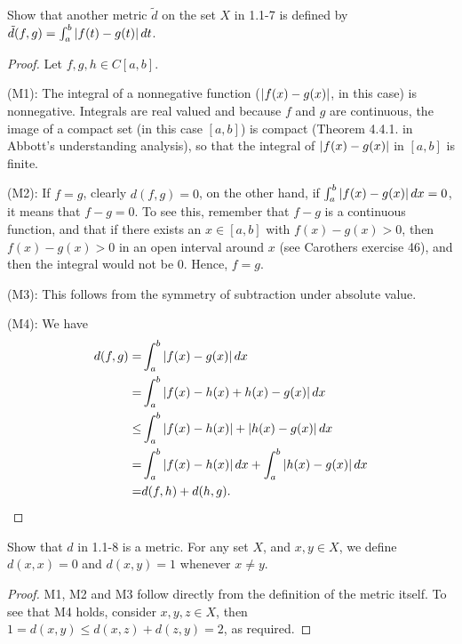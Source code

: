 \begin{exercise}{8}
Show that another metric $\tilde{d}$ on the set $X$ in 1.1-7 is defined by $\tilde{d}(f,g)=\int_a^b\left\lvert f(t)-g(t)\right\rvert dt$.
\end{exercise}
\begin{proof}
Let $f,g,h\in C[a,b]$.

(M1): The integral of a nonnegative function ($\left\lvert f(x)-g(x)\right\rvert$, in this case) is nonnegative. Integrals are real valued and because $f$ and $g$ are continuous, the image of a compact set (in this case $[a,b]$) is compact (Theorem 4.4.1. in Abbott's understanding analysis), so that the integral of $\left\lvert f(x)-g(x)\right\rvert$ in $[a,b]$ is finite.

(M2): If $f=g$, clearly $d(f,g)=0$, on the other hand, if $\int_a^b\left\lvert f(x)-g(x)\right\rvert dx =0$, it means that $f-g=0$. To see this, remember that $f-g$ is a continuous function, and that if there exists an $x\in [a,b]$ with $f(x)-g(x)>0$, then $f(x)-g(x)>0$ in an open interval around $x$ (see Carothers exercise 46), and then the integral would not be 0. Hence, $f=g$.

(M3): This follows from the symmetry of subtraction under absolute value.

(M4): We have 
\begin{align*}
    d(f,g) =& \int_a^b\left\lvert f(x)-g(x)\right\rvert dx\\
    =&\int_a^b\left\lvert f(x)-h(x)+h(x)-g(x)\right\rvert dx\\
    \leq& \int_a^b\left\lvert f(x)-h(x)\right\rvert+\left\lvert h(x)-g(x)\right\rvert dx\\
    =& \int_a^b\left\lvert f(x)-h(x)\right\rvert dx+\int_a^b\left\lvert h(x)-g(x)\right\rvert dx\\
    =& d(f,h) + d(h,g).
\end{align*}
\end{proof}

\begin{exercise}{9}
Show that $d$ in 1.1-8 is a metric. For any set $X$, and $x,y\in X$, we define $d(x,x)=0$ and $d(x,y)=1$ whenever $x\neq y$.
\end{exercise}
\begin{proof}
M1, M2 and M3 follow directly from the definition of the metric itself. To see that M4 holds, consider $x,y,z\in X$, then $1=d(x,y)\leq d(x,z)+d(z,y)=2$, as required.
\end{proof}


